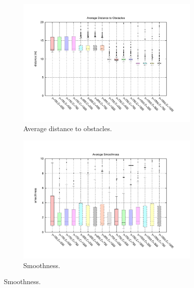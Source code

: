 \begin{figure}[h!]
  \centering
  \begin{subfigure}[b]{\textwidth}
	  \centering
	  \includegraphics[width=\textwidth,height=0.5\textwidth,trim=55 50 85 60,clip]{figure8}
	  \caption{Average distance to obstacles.}
	  \label{fig:cp06_avg_dist_msvmpp}
  \end{subfigure}  

  \begin{subfigure}[b]{\textwidth}
	  \centering
	  \includegraphics[width=\textwidth,height=0.5\textwidth,trim=55 50 85 60,clip]{figure9}
	  \caption{Smoothness.}
	  \label{fig:cp06_smoothness_msvmpp}
  \end{subfigure}        
\end{figure}

